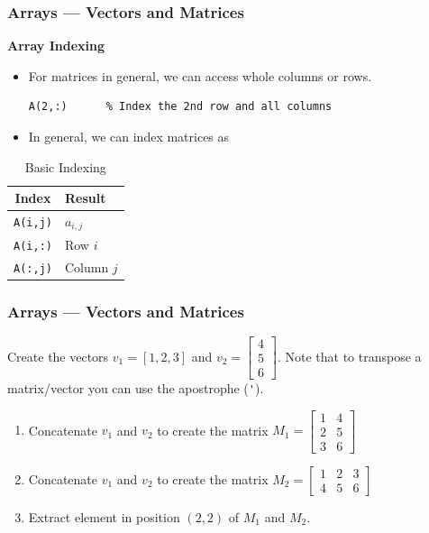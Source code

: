 \documentclass[11pt,xcolor={svgnames},aspectratio=169,usepdftitle=false]{beamer}
\begin{document}
\begin{frame}[fragile]
    \frametitle{Arrays --- Vectors and Matrices}
\alert{\textbf{Array Indexing}}
    \begin{itemize}
        \item For matrices in general, we can access whole columns or rows.
\begin{lstlisting}
A(2,:)      % Index the 2nd row and all columns
\end{lstlisting}
        \item In general, we can index matrices as
    \end{itemize}
    \begin{table}[htbp]
        \caption{Basic Indexing}
        \label{tab:basic_indexing}
        \begin{tabular}{@{}cl@{}}
        \toprule
        Index & Result \\ \midrule
        \verb+A(i,j)+  & $a_{i,j}$ \\ 
        \verb+A(i,:)+  & Row $i$ \\ 
        \verb+A(:,j)+  & Column $j$ \\ \bottomrule
        \end{tabular}
    \end{table}
\end{frame}

\begin{frame}[fragile]
  \frametitle{Arrays --- Vectors and Matrices}
 \begin{exercise}
   Create the vectors $v_1 = [1, 2, 3]$ and $v_2 = \begin{bmatrix}
   4 \\
   5 \\ 
   6
   \end{bmatrix}$. Note that to transpose a matrix/vector you can use the apostrophe (\verb;';).
   \begin{enumerate}
    \item Concatenate $v_1$ and $v_2$ to create the matrix $M_1 = \begin{bmatrix}
        1 & 4 \\
        2 & 5 \\
        3 & 6 
    \end{bmatrix}$
    \item Concatenate $v_1$ and $v_2$ to create the matrix $M_2 = \begin{bmatrix}
        1 & 2 & 3 \\
        4 & 5 & 6 
    \end{bmatrix}$
    \item Extract element in position $(2,2)$ of $M_1$ and $M_2$.
   \end{enumerate} 
 \end{exercise}
  
\end{frame}
\end{document}

